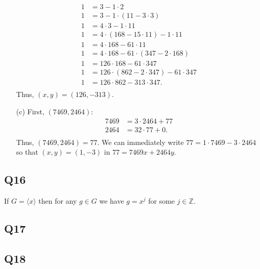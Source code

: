 \documentclass[12pt]{article}
\def\Z{{\mathbb Z}}        %
\numberwithin{theorem}{section}
\numberwithin{equation}{section}
\numberwithin{remark}{section}
\numberwithin{definition}{section}
\numberwithin{theorem}{section}
\numberwithin{lemma}{section}
\numberwithin{example}{section}
\begin{document}
\begin{itemize}
{	\begin{align*}
		1 & = 3 - 1\cdot2\\
		1 & = 3 - 1\cdot(11-3\cdot3)\\
		1 & = 4\cdot 3 - 1\cdot11\\
		1 & = 4\cdot (168-15\cdot11) - 1\cdot11\\
		1 & = 4\cdot 168 - 61\cdot11\\
		1 & = 4\cdot 168 - 61\cdot(347-2\cdot168)\\
		1 & = 126\cdot 168 - 61\cdot 347\\
		1 & = 126\cdot (862-2\cdot347) - 61\cdot 347\\
		1 & = 126\cdot 862 - 313\cdot 347.\\
	\end{align*}
	Thus, $(x,y)=(126,-313)$.}
	\item[(c)]{First, $(7469,2464)$:
	\begin{align*}
		7469 & = 3\cdot2464 + 77\\
		2464 & = 32\cdot77 + 0.\\
	\end{align*}
	Thus, $(7469,2464)=77$. We can immediately write $77=1\cdot7469-3\cdot2464$ so that $(x,y)=(1,-3)$ in $77=7469x+2464y$.}
\end{itemize}

\subsection{Q16}

If $G=\langle x \rangle$ then for any $g\in G$ we have $g=x^j$ for some $j\in\Z$. 



\subsection{Q17}

\subsection{Q18}
\end{document}
